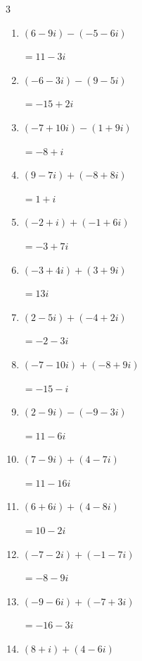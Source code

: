 \begin{multicols}{3}
\begin{enumerate}
\resetques

  \item $\displaystyle (6-9i) - (-5-6i)$

        $\displaystyle =11-3i$

  \item $\displaystyle (-6-3i) - (9-5i)$

        $\displaystyle =-15+2i$

  \item $\displaystyle (-7+10i) - (1+9i)$

        $\displaystyle =-8+i$

  \item $\displaystyle (9-7i) + (-8+8i)$

        $\displaystyle =1+i$

  \item $\displaystyle (-2+i) + (-1+6i)$

        $\displaystyle =-3+7i$

  \item $\displaystyle (-3+4i) + (3+9i)$

        $\displaystyle =13i$

  \item $\displaystyle (2-5i) + (-4+2i)$

        $\displaystyle =-2-3i$

  \item $\displaystyle (-7-10i) + (-8+9i)$

        $\displaystyle =-15-i$

  \item $\displaystyle (2-9i) - (-9-3i)$

        $\displaystyle =11-6i$

  \item $\displaystyle (7-9i) + (4-7i)$

        $\displaystyle =11-16i$

  \item $\displaystyle (6+6i) + (4-8i)$

        $\displaystyle =10-2i$

  \item $\displaystyle (-7-2i) + (-1-7i)$

        $\displaystyle =-8-9i$

  \item $\displaystyle (-9-6i) + (-7+3i)$

        $\displaystyle =-16-3i$

  \item $\displaystyle (8+i) + (4-6i)$


\end{enumerate}
\end{multicols}
